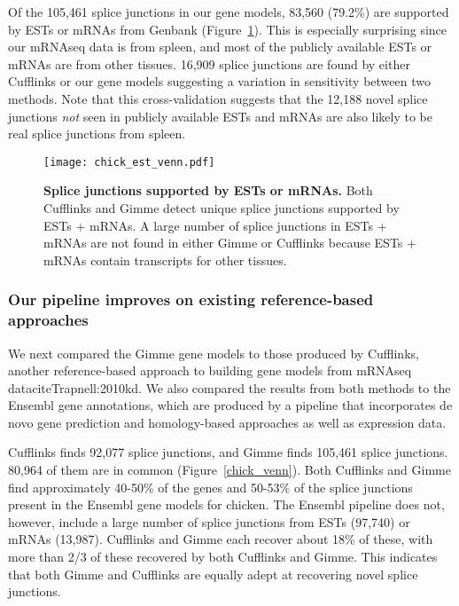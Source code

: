 Of the 105,461 splice junctions in our gene models, 83,560 (79.2\%) are
supported by ESTs or mRNAs from Genbank (Figure~\ref{chick_est_venn}).  This is
especially surprising since our mRNAseq data is from spleen, and most of the
publicly available ESTs or mRNAs are from other tissues. 16,909 splice junctions
are found by either Cufflinks or our gene models suggesting a variation in
sensitivity between two methods. Note that this cross-validation suggests that
the 12,188 novel splice junctions {\em not} seen in publicly available ESTs and
mRNAs are also likely to be real splice junctions from spleen.

\clearpage\pagestyle{lscape}
\begin{landscape}
\begin{figure}[!ht]
\begin{center}
\texttt{[image: chick\_est\_venn.pdf]}
\end{center}
\caption{
    \textbf{Splice junctions supported by ESTs or mRNAs.}
    Both Cufflinks and Gimme detect unique splice junctions
    supported by ESTs + mRNAs.  A large number of splice
    junctions in ESTs + mRNAs are not found in either Gimme or
    Cufflinks because ESTs + mRNAs contain transcripts for other
    tissues.
}
\label{chick_est_venn}
\end{figure}
\end{landscape}
\pagestyle{plain}

\subsubsection{Our pipeline improves on existing reference-based approaches}

We next compared the Gimme gene models to those produced by Cufflinks,
another reference-based approach to building gene models from mRNAseq
datacite{Trapnell:2010kd}.  We also compared the results from both
methods to the Ensembl gene annotations, which are produced by a
pipeline that incorporates de novo gene prediction and homology-based
approaches as well as expression data.

Cufflinks finds 92,077 splice junctions, and Gimme finds 105,461 splice
junctions.  80,964 of them are in common (Figure~\ref{chick_venn}). Both
Cufflinks and Gimme find approximately 40-50\% of the genes and 50-53\% of the
splice junctions present in the Ensembl gene models for chicken.  The Ensembl
pipeline does not, however, include a large number of splice junctions from ESTs
(97,740) or mRNAs (13,987).  Cufflinks and Gimme each recover about 18\% of
these, with more than 2/3 of these recovered by both Cufflinks and Gimme.  This
indicates that both Gimme and Cufflinks are equally adept at recovering novel
splice junctions.

